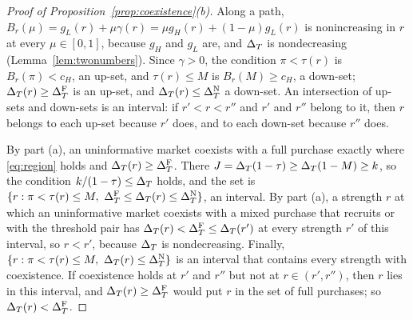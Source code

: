 \begin{proof}[Proof of Proposition~\ref{prop:coexistence}(b)]
Along a path, \(B_r(\mu)=g_L(r)+\mu\gamma(r)=\mu g_H(r)+(1-\mu)g_L(r)\) is nonincreasing in \(r\) at every
\(\mu\in[0,1]\), because \(g_H\) and \(g_L\) are, and \(\Delta_T\) is nondecreasing (Lemma~\ref{lem:twonumbers}). Since
\(\gamma>0\), the condition \(\pi<\tau(r)\) is \(B_r(\pi)<c_H\), an up-set, and \(\tau(r)\le M\) is \(B_r(M)\ge c_H\), a
down-set; \(\Delta_T(r)\ge\Delta_T^{\rm F}\) is an up-set, and \(\Delta_T(r)\le\Delta_T^{\rm N}\) a down-set. An intersection of up-sets and
down-sets is an interval: if \(r'<r<r''\) and \(r'\) and \(r''\) belong to it, then \(r\) belongs to each up-set
because \(r'\) does, and to each down-set because \(r''\) does.

By part (a), an uninformative market coexists with a full purchase exactly where \eqref{eq:region} holds and
\(\Delta_T(r)\ge\Delta_T^{\rm F}\). There \(J=\Delta_T(1-\tau)\ge\Delta_T(1-M)\ge k\), so the condition \(k/(1-\tau)\le\Delta_T\) holds, and the
set is \(\{r:\pi<\tau(r)\le M,\ \Delta_T^{\rm F}\le\Delta_T(r)\le\Delta_T^{\rm N}\}\), an interval. By part (a), a strength \(r\) at which
an uninformative market coexists with a mixed purchase that recruits or with the threshold pair has
\(\Delta_T(r)<\Delta_T^{\rm F}\le\Delta_T(r')\) at every strength \(r'\) of this interval, so \(r<r'\), because \(\Delta_T\) is
nondecreasing. Finally, \(\{r:\pi<\tau(r)\le M,\ \DT(r)\le\DT^{\rm N}\}\) is an interval that contains every strength
with coexistence. If coexistence holds at \(r'\) and \(r''\) but not at \(r\in(r',r'')\), then \(r\) lies in this
interval, and \(\Delta_T(r)\ge\Delta_T^{\rm F}\) would put \(r\) in the set of full purchases; so \(\Delta_T(r)<\Delta_T^{\rm F}\).
\end{proof}

